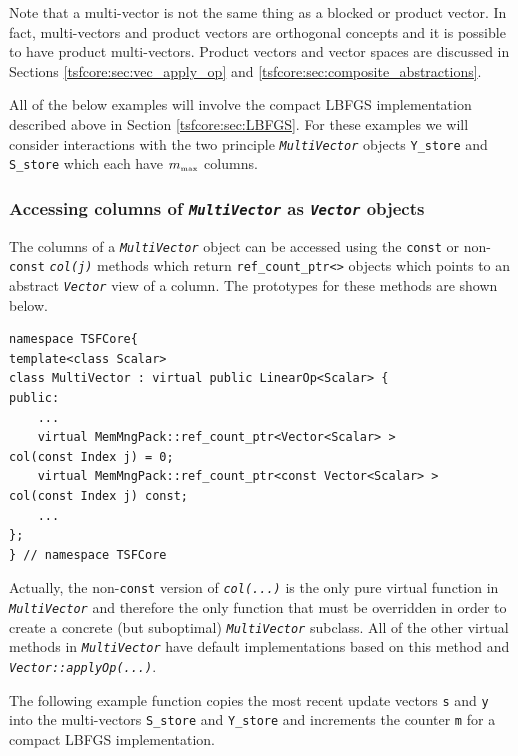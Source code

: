 Note that a multi-vector is not the same thing as a blocked or product
vector.  In fact, multi-vectors and product vectors are orthogonal
concepts and it is possible to have product multi-vectors.  Product
vectors and vector spaces are discussed in Sections
\ref{tsfcore:sec:vec_apply_op} and \ref{tsfcore:sec:composite_abstractions}.

All of the below examples will involve the compact LBFGS
implementation described above in Section \ref{tsfcore:sec:LBFGS}.
For these examples we will consider interactions with the two
principle
\texttt{\textit{Multi\-Vector}} objects \texttt{Y\_store} and
\texttt{S\_store} which each have $m_{\tiny\mbox{max}}$ columns.

%
\subsubsection{Accessing columns of \texttt{\textit{Multi\-Vector}}
as \texttt{\textit{Vector}} objects}
%

The columns of a \texttt{\textit{Multi\-Vector}} object can be accessed
using the \texttt{const} or non-\texttt{const}
\texttt{\textit{col(j)}} methods which return
\texttt{ref\_count\_ptr<>} objects which points to an abstract
\texttt{\textit{Vector}} view of a column.  The prototypes for these
methods are shown below.

{\scriptsize\begin{verbatim}
namespace TSFCore{
template<class Scalar>
class MultiVector : virtual public LinearOp<Scalar> {
public:
    ...
    virtual MemMngPack::ref_count_ptr<Vector<Scalar> >        col(const Index j) = 0;
    virtual MemMngPack::ref_count_ptr<const Vector<Scalar> >  col(const Index j) const;
    ...
};
} // namespace TSFCore
\end{verbatim}}

\noindent Actually, the non-\texttt{const} version of \texttt{\textit{col(...)}}
is the only pure virtual function in \texttt{\textit{Multi\-Vector}} and
therefore the only function that must be overridden in order to create
a concrete (but suboptimal) \texttt{\textit{Multi\-Vector}} subclass.
All of the other virtual methods in \texttt{\textit{Multi\-Vector}} have
default implementations based on this method and
\texttt{\textit{Vector\-::applyOp(\-...)}}.

The following example function copies the most recent update vectors
\texttt{s} and \texttt{y} into the multi-vectors \texttt{S\_store}
and \texttt{Y\_store} and increments the counter \texttt{m} for a
compact LBFGS implementation.


